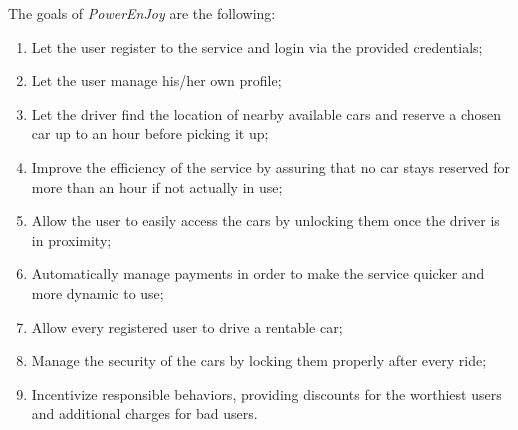 The goals of \hbox{\emph{PowerEnJoy}} are the following:

\begin{enumerate}
\item Let the user register to the service and login via the provided credentials;
\item Let the user manage his/her own profile;
\item Let the driver find the location of nearby available cars and reserve a chosen car up to an hour before picking it up;
\item Improve the efficiency of the service by assuring that no car stays reserved for more than an hour if not actually in use;
\item Allow the user to easily access the cars by unlocking them once the driver is in proximity;
\item Automatically manage payments in order to make the service quicker and more dynamic to use; 
\item Allow every registered user to drive a rentable car;
\item Manage the security of the cars by locking them properly after every ride;
\item Incentivize responsible behaviors, providing discounts for the worthiest users and additional charges for bad users.
\end{enumerate}